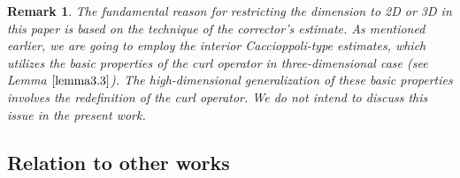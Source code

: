 \documentclass[13pt,CJK]{article}
\theoremstyle{plain}                       %
\newtheorem{remark}[lemma]{Remark}
\theoremstyle{remark}
\numberwithin{equation}{section}
\begin{document}
\begin{remark}
\emph{The fundamental reason for restricting the dimension to 2D or 3D in this paper is based on the technique of the corrector's estimate. As mentioned earlier, we are going to employ the interior Caccioppoli-type estimates, which utilizes the basic properties of the curl operator in three-dimensional case (see Lemma $\ref{lemma3.3}$). The high-dimensional generalization of these basic properties involves the redefinition of the curl operator.
We do not intend to discuss this issue in the present work. }
\end{remark}




\subsection{\centering Relation to other works}
\end{document}
